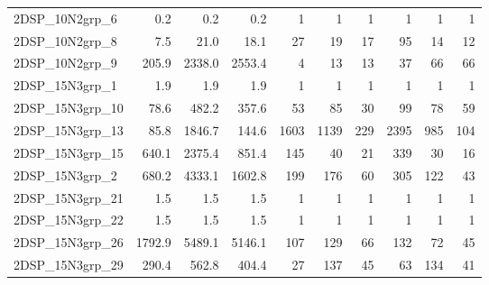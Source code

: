 \documentclass[a4paper,10pt]{article}
\theoremstyle{definition}
\begin{document}
\begin{table}[t]
\begin{scriptsize}
\begin{tabular*}{\textwidth}{@{}l@{\;\;\extracolsep{\fill}}rrrrrrrrr@{}}
  2DSP\_10N2grp\_6 & \num{   0.2} & \num{   0.2} & \num{   0.2} & \num{         1} & \num{         1} & \num{         1} & \num{         1} & \num{         1} & \num{         1}\\
  2DSP\_10N2grp\_8 & \num{   7.5} & \num{  21.0} & \num{  18.1} & \num{        27} & \num{        19} & \num{        17} & \num{        95} & \num{        14} & \num{        12}\\
  2DSP\_10N2grp\_9 & \num{ 205.9} & \num{2338.0} & \num{2553.4} & \num{         4} & \num{        13} & \num{        13} & \num{        37} & \num{        66} & \num{        66}\\
  2DSP\_15N3grp\_1 & \num{   1.9} & \num{   1.9} & \num{   1.9} & \num{         1} & \num{         1} & \num{         1} & \num{         1} & \num{         1} & \num{         1}\\
 2DSP\_15N3grp\_10 & \num{  78.6} & \num{ 482.2} & \num{ 357.6} & \num{        53} & \num{        85} & \num{        30} & \num{        99} & \num{        78} & \num{        59}\\
 2DSP\_15N3grp\_13 & \num{  85.8} & \num{1846.7} & \num{ 144.6} & \num{      1603} & \num{      1139} & \num{       229} & \num{      2395} & \num{       985} & \num{       104}\\
 2DSP\_15N3grp\_15 & \num{ 640.1} & \num{2375.4} & \num{ 851.4} & \num{       145} & \num{        40} & \num{        21} & \num{       339} & \num{        30} & \num{        16}\\
  2DSP\_15N3grp\_2 & \num{ 680.2} & \num{4333.1} & \num{1602.8} & \num{       199} & \num{       176} & \num{        60} & \num{       305} & \num{       122} & \num{        43}\\
 2DSP\_15N3grp\_21 & \num{   1.5} & \num{   1.5} & \num{   1.5} & \num{         1} & \num{         1} & \num{         1} & \num{         1} & \num{         1} & \num{         1}\\
 2DSP\_15N3grp\_22 & \num{   1.5} & \num{   1.5} & \num{   1.5} & \num{         1} & \num{         1} & \num{         1} & \num{         1} & \num{         1} & \num{         1}\\
 2DSP\_15N3grp\_26 & \num{1792.9} & \num{5489.1} & \num{5146.1} & \num{       107} & \num{       129} & \num{        66} & \num{       132} & \num{        72} & \num{        45}\\
 2DSP\_15N3grp\_29 & \num{ 290.4} & \num{ 562.8} & \num{ 404.4} & \num{        27} & \num{       137} & \num{        45} & \num{        63} & \num{       134} & \num{        41}\\

\end{tabular*}
\end{scriptsize}
\end{table}
\end{document}
